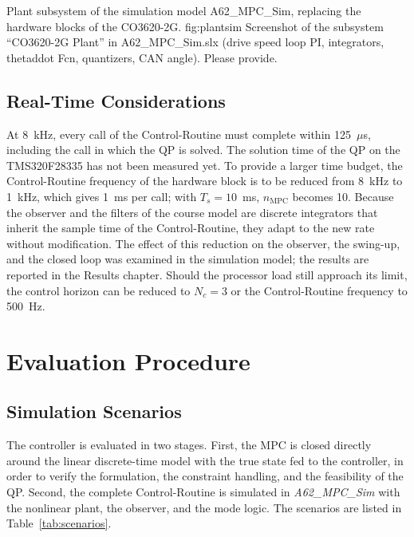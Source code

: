   {Plant subsystem of the simulation model A62\_MPC\_Sim, replacing the hardware blocks of the CO3620-2G.}
  {fig:plantsim}
  {Screenshot of the subsystem ``CO3620-2G Plant'' in A62\_MPC\_Sim.slx (drive speed loop PI, integrators, thetaddot Fcn, quantizers, CAN angle). Please provide.}

\subsection{Real-Time Considerations}
\label{subsec:realtime}

At 8~kHz, every call of the Control-Routine must complete within 125~$\mu$s,
including the call in which the \ac{QP} is solved. The solution time of the
\ac{QP} on the TMS320F28335 has not been measured yet. To provide a larger
time budget, the Control-Routine frequency of the hardware block is to be
reduced from 8~kHz to 1~kHz, which gives 1~ms per call; with $T_s = 10$~ms,
$n_{\mathrm{MPC}}$ becomes 10. Because the observer and the filters of the
course model are discrete integrators that inherit the sample time of the
Control-Routine, they adapt to the new rate without modification. The effect
of this reduction on the observer, the swing-up, and the closed loop was
examined in the simulation model; the results are reported in the Results
chapter. Should the
processor load still approach its limit, the control horizon can be reduced to
$N_c = 3$ or the Control-Routine frequency to 500~Hz.

\section{Evaluation Procedure}
\label{sec:evaluation}

\subsection{Simulation Scenarios}
\label{subsec:scenarios}

The controller is evaluated in two stages. First, the \ac{MPC} is closed
directly around the linear discrete-time model with the true state fed to the
controller, in order to verify the formulation, the constraint handling, and
the feasibility of the \ac{QP}. Second, the complete Control-Routine is
simulated in \emph{A62\_MPC\_Sim} with the nonlinear plant, the observer, and
the mode logic. The scenarios are listed in Table~\ref{tab:scenarios}.

